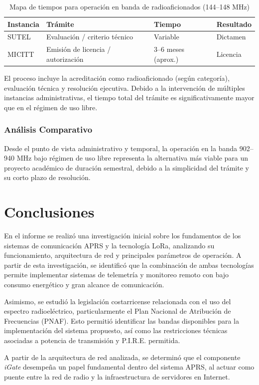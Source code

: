 \documentclass[conference]{IEEEtran}
\begin{document}
\begin{table}[t]
\caption{Mapa de tiempos para operación en banda de radioaficionados (144--148 MHz)}
\label{tab:mapa_tiempos_radioaficionados}
\centering
\scriptsize
\setlength{\tabcolsep}{3pt}
\renewcommand{\arraystretch}{1.15}
\begin{tabularx}{\columnwidth}{@{}l X l l@{}}
\toprule
\textbf{Instancia} & \textbf{Trámite} & \textbf{Tiempo} & \textbf{Resultado} \\
\midrule
SUTEL & Evaluación / criterio técnico & Variable & Dictamen \\
MICITT & Emisión de licencia / autorización & 3--6 meses (aprox.) & Licencia \\
\bottomrule
\end{tabularx}
\end{table}

El proceso incluye la acreditación como radioaficionado (según categoría), evaluación técnica y resolución ejecutiva. Debido a la intervención de múltiples instancias administrativas, el tiempo total del trámite es significativamente mayor que en el régimen de uso libre.

\subsubsection{Análisis Comparativo}
Desde el punto de vista administrativo y temporal, la operación en la banda 902--940 MHz bajo régimen de uso libre representa la alternativa más viable para un proyecto académico de duración semestral, debido a la simplicidad del trámite y su corto plazo de resolución.
\section{Conclusiones}

En el informe se realizó una investigación inicial sobre los fundamentos de los sistemas de comunicación APRS y la tecnología LoRa, analizando su funcionamiento, arquitectura de red y principales parámetros de operación. A partir de esta investigación, se identificó que la combinación de ambas tecnologías permite implementar sistemas de telemetría y monitoreo remoto con bajo consumo energético y gran alcance de comunicación.

Asimismo, se estudió la legislación costarricense relacionada con el uso del espectro radioeléctrico, particularmente el Plan Nacional de Atribución de Frecuencias (PNAF). Esto permitió identificar las bandas disponibles para la implementación del sistema propuesto, así como las restricciones técnicas asociadas a potencia de transmisión y P.I.R.E. permitida.

A partir de la arquitectura de red analizada, se determinó que el componente \textit{iGate} desempeña un papel fundamental dentro del sistema APRS, al actuar como puente entre la red de radio y la infraestructura de servidores en Internet.



\end{document}
